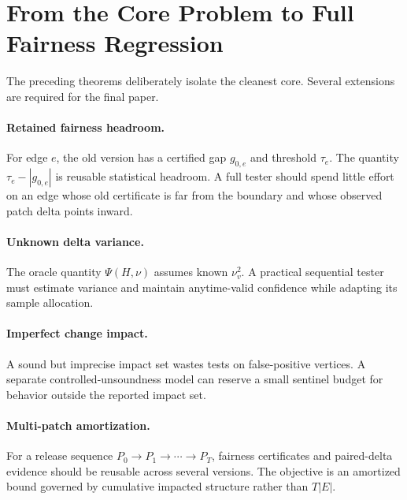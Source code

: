 \section{From the Core Problem to Full Fairness Regression}
\label{arch:sec:open}

The preceding theorems deliberately isolate the cleanest core.  Several extensions
are required for the final paper.

\paragraph{Retained fairness headroom.}
For edge $e$, the old version has a certified gap $g_{0,e}$ and threshold $\tau_e$.
The quantity $\tau_e-|g_{0,e}|$ is reusable statistical headroom.  A full tester
should spend little effort on an edge whose old certificate is far from the
boundary and whose observed patch delta points inward.

\paragraph{Unknown delta variance.}
The oracle quantity $\Psi(H,\nu)$ assumes known $\nu_v^2$.  A practical sequential
tester must estimate variance and maintain anytime-valid confidence while adapting
its sample allocation.

\paragraph{Imperfect change impact.}
A sound but imprecise impact set wastes tests on false-positive vertices.  A
separate controlled-unsoundness model can reserve a small sentinel budget for
behavior outside the reported impact set.

\paragraph{Multi-patch amortization.}
For a release sequence $P_0\to P_1\to\cdots\to P_T$, fairness certificates and
paired-delta evidence should be reusable across several versions.  The objective
is an amortized bound governed by cumulative impacted structure rather than
$T|E|$.

